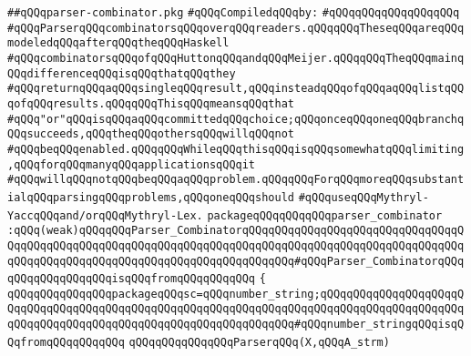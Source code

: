 \label{src/lib/src/parser-combinator.pkg}
\verb|##qQQqparser-combinator.pkg|\newline
\newline
\verb|#qQQqCompiledqQQqby:|\newline
\verb|#qQQqqQQqqQQqqQQqqQQq|\newline
\newline
\verb|#qQQqParserqQQqcombinatorsqQQqoverqQQqreaders.qQQqqQQqTheseqQQqareqQQqmodeledqQQqafterqQQqtheqQQqHaskell|\newline
\verb|#qQQqcombinatorsqQQqofqQQqHuttonqQQqandqQQqMeijer.qQQqqQQqTheqQQqmainqQQqdifferenceqQQqisqQQqthatqQQqthey|\newline
\verb|#qQQqreturnqQQqaqQQqsingleqQQqresult,qQQqinsteadqQQqofqQQqaqQQqlistqQQqofqQQqresults.qQQqqQQqThisqQQqmeansqQQqthat|\newline
\verb|#qQQq"or"qQQqisqQQqaqQQqcommittedqQQqchoice;qQQqonceqQQqoneqQQqbranchqQQqsucceeds,qQQqtheqQQqothersqQQqwillqQQqnot|\newline
\verb|#qQQqbeqQQqenabled.qQQqqQQqWhileqQQqthisqQQqisqQQqsomewhatqQQqlimiting,qQQqforqQQqmanyqQQqapplicationsqQQqit|\newline
\verb|#qQQqwillqQQqnotqQQqbeqQQqaqQQqproblem.qQQqqQQqForqQQqmoreqQQqsubstantialqQQqparsingqQQqproblems,qQQqoneqQQqshould|\newline
\verb|#qQQquseqQQqMythryl-YaccqQQqand/orqQQqMythryl-Lex.|\newline
\newline
\newline
\verb|packageqQQqqQQqqQQqparser_combinator|\newline
\verb|:qQQq(weak)qQQqqQQqParser_CombinatorqQQqqQQqqQQqqQQqqQQqqQQqqQQqqQQqqQQqqQQqqQQqqQQqqQQqqQQqqQQqqQQqqQQqqQQqqQQqqQQqqQQqqQQqqQQqqQQqqQQqqQQqqQQqqQQqqQQqqQQqqQQqqQQqqQQqqQQqqQQqqQQqqQQq#qQQqParser_CombinatorqQQqqQQqqQQqqQQqqQQqisqQQqfromqQQqqQQqqQQq|\newline
\verb|{|\newline
\verb|qQQqqQQqqQQqqQQqpackageqQQqsc=qQQqnumber_string;qQQqqQQqqQQqqQQqqQQqqQQqqQQqqQQqqQQqqQQqqQQqqQQqqQQqqQQqqQQqqQQqqQQqqQQqqQQqqQQqqQQqqQQqqQQqqQQqqQQqqQQqqQQqqQQqqQQqqQQqqQQqqQQqqQQqqQQq#qQQqnumber_stringqQQqisqQQqfromqQQqqQQqqQQq|\newline
\newline
\verb|qQQqqQQqqQQqqQQqParserqQQq(X,qQQqA_strm)|\newline
